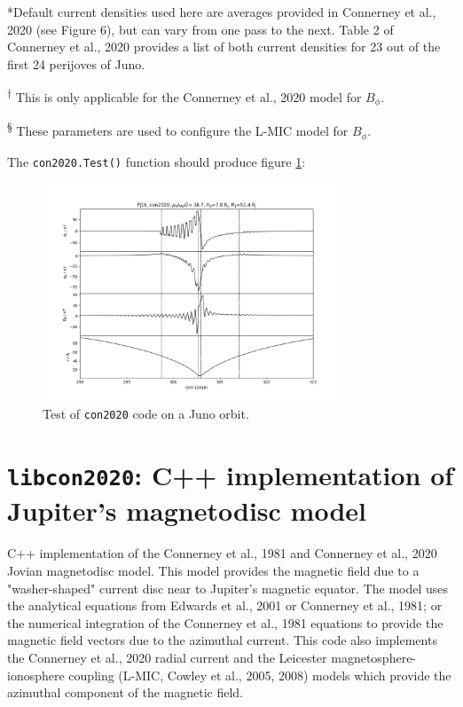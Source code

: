 	*Default current densities used here are averages provided in Connerney et al., 2020 (see Figure 6), but can vary from one pass to the next. Table 2 of Connerney et al., 2020 provides a list of both current densities for 23 out of the first 24 perijoves of Juno.
	
	\textsuperscript{†} This is only applicable for the Connerney et al., 2020 model for $B_{\phi}$.
	
	\textsuperscript{§} These parameters are used to configure the L-MIC model for $B_{\phi}$.
	
	The \texttt{con2020.Test()} function should produce figure \ref{Figcon20202Test}:
	
	\begin{figure}
		\centering\includegraphics[width=0.8\textwidth]{figures/ch3_con2020Test.png}
		\caption{Test of \texttt{con2020} code on a Juno orbit.\label{Figcon20202Test}}
	\end{figure}


	\section{\texttt{libcon2020}: C++ implementation of Jupiter's magnetodisc model}


	
	C++ implementation of the Connerney et al., 1981 and Connerney et al., 2020 Jovian magnetodisc model. This model provides the magnetic field due to a "washer-shaped" current disc near to Jupiter's magnetic equator. The model uses the analytical equations from Edwards et al., 2001 or Connerney et al., 1981; or the numerical integration of the Connerney et al., 1981 equations to provide the magnetic field vectors due to the azimuthal current. This code also implements the Connerney et al., 2020 radial current and the Leicester magnetosphere-ionosphere coupling (L-MIC, Cowley et al., 2005, 2008) models which provide the azimuthal component of the magnetic field.
	
